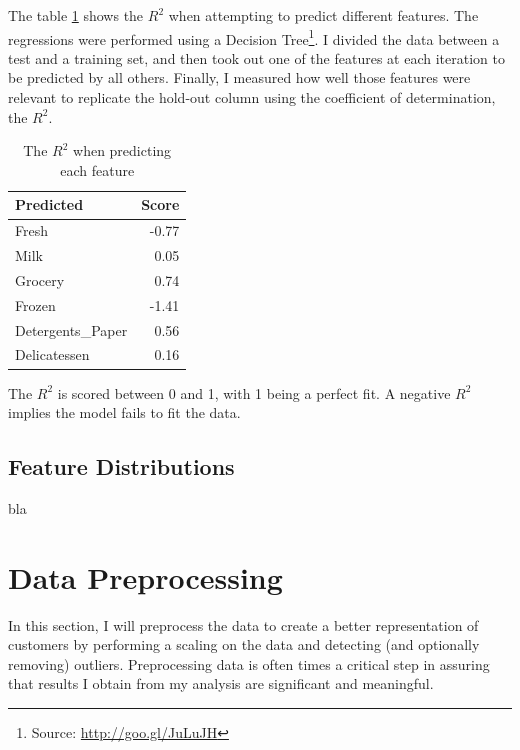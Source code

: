 \documentclass[a4paper]{article}
\begin{document}
The table  \ref{tab:r2} shows the $R^{2}$ when attempting to predict different features. The regressions were performed using a Decision Tree\footnote{Source: \url{http://goo.gl/JuLuJH}}. I divided the data between a test and a training set, and then took out one of the features at each iteration to be predicted by all others. Finally, I measured how well those features were relevant to replicate the hold-out column using the coefficient of determination, the $R^{2}$.

\begin{table}[ht!]
\centering
\begin{tabular}{l|r}
{Predicted} &  Score \\\hline
Fresh            &  -0.77 \\
Milk             &   0.05 \\
Grocery          &   0.74 \\
Frozen           &  -1.41 \\
Detergents\_Paper &   0.56 \\
Delicatessen     &   0.16 \\

\end{tabular}
\caption{\label{tab:r2}The $R^{2}$ when predicting each feature}
\end{table}

The $R^2$ is scored between 0 and 1, with 1 being a perfect fit. A negative $R^2$ implies the model fails to fit the data.


\subsection{Feature Distributions}

bla


\section{Data Preprocessing}
\label{sec:data_preprocessing}
In this section, I will preprocess the data to create a better representation of customers by performing a scaling on the data and detecting (and optionally removing) outliers. Preprocessing data is often times a critical step in assuring that results I obtain from my analysis are significant and meaningful.
\end{document}
